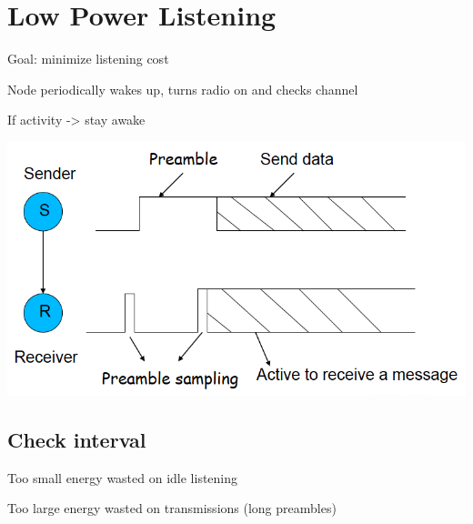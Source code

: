 \section{Low Power Listening}

Goal: minimize listening cost

Node periodically wakes up, turns radio on and checks channel

If activity -> stay awake

\begin{center}
 \includegraphics[scale=0.5]{img/LPL-PreambleSampling.png}
\end{center}

\subsection{Check interval}
\begin{description}
	\item{Too small} energy wasted on idle listening
	\item{Too large} energy wasted on transmissions (long preambles)
\end{description}

